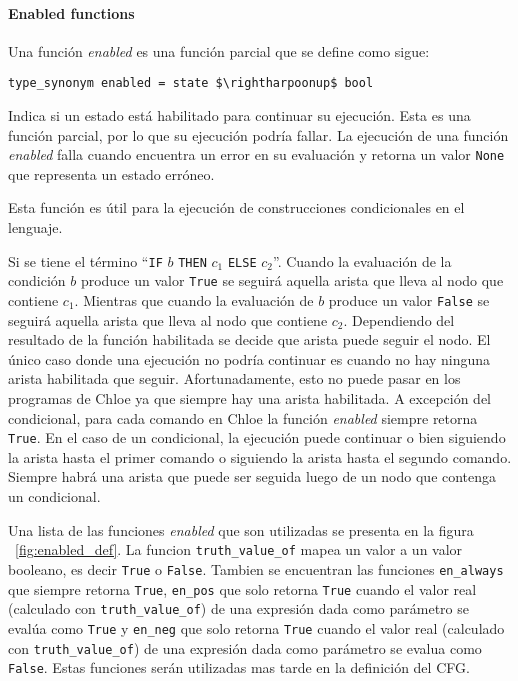 \paragraph*{Enabled functions}\label{paragraph:enabled}

Una función \textit{enabled} es una función parcial que se define como sigue:

\begin{lstlisting}[mathescape=true, frame=single]
type_synonym enabled = state $\rightharpoonup$ bool
\end{lstlisting}

Indica si un estado está habilitado para continuar su ejecución.
Esta es una función parcial, por lo que su ejecución podría fallar.
La ejecución de una función \textit{enabled} falla cuando encuentra un error en su evaluación y retorna un valor \verb|None| que representa un estado erróneo.

Esta función es útil para la ejecución de construcciones condicionales en el lenguaje.

Si se tiene el término ``\verb|IF| $b$ \verb|THEN| $c_{1}$ \verb|ELSE| $c_{2}$''.
Cuando la evaluación de la condición $b$ produce un valor \verb|True| se seguirá aquella arista que lleva al nodo que contiene $c_1$.
Mientras que cuando la evaluación de $b$ produce un valor \verb|False| se seguirá aquella arista que lleva al nodo que contiene $c_2$.
Dependiendo del resultado de la función habilitada se decide que arista puede seguir el nodo.
El único caso donde una ejecución no podría continuar es cuando no hay ninguna arista habilitada que seguir.
Afortunadamente, esto no puede pasar en los programas de Chloe ya que siempre hay una arista habilitada.
A excepción del condicional, para cada comando en Chloe la función \textit{enabled} siempre retorna \verb|True|.
En el caso de un condicional, la ejecución puede continuar o bien siguiendo la arista hasta el primer comando o siguiendo la arista hasta el segundo comando.
Siempre habrá una arista que puede ser seguida luego de un nodo que contenga un condicional.

Una lista de las funciones \textit{enabled} que son utilizadas se presenta en la figura ~\ref{fig:enabled_def}.
La funcion \verb|truth_value_of| mapea un valor a un valor booleano, es decir \verb|True| o \verb|False|.
Tambien se encuentran las funciones \verb|en_always| que siempre retorna \verb|True|, \verb|en_pos| que solo retorna \verb|True| cuando el valor real (calculado con \verb|truth_value_of|) de una expresión dada como parámetro se evalúa como \verb|True| y \verb|en_neg| que solo retorna \verb|True| cuando el valor real (calculado con \verb|truth_value_of|) de una expresión dada como parámetro se evalua como \verb|False|.
Estas funciones serán utilizadas mas tarde en la definición del CFG.


